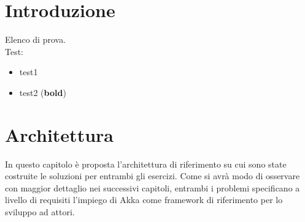 \documentclass[12pt,a4paper,openright,oneside]{report}
\begin{document}
	\begin{titlepage}                       %
		\newpage                                %
		\clearpage{\pagestyle{empty}\cleardoublepage}%
	\end{titlepage}
	\tableofcontents                        %
	\clearpage{\pagestyle{empty}\cleardoublepage}
	\listoffigures                          %
	\clearpage{\pagestyle{empty}\cleardoublepage}
	\listoftables                           %
	\clearpage{\pagestyle{empty}\cleardoublepage}
	\lstlistoflistings						%
	\clearpage{\pagestyle{empty}\cleardoublepage}
	\chapter*{Introduzione}                 %
	Elenco di prova.\\
	Test:
	\begin{itemize}
		\item test1
		\item test2 (\textbf{bold})
	\end{itemize}
	\clearpage{\pagestyle{empty}\cleardoublepage}
	\chapter{Architettura}           %
	\lhead[\fancyplain{}{\bfseries\thepage}]{\fancyplain{}{\bfseries\rightmark}}
	In questo capitolo è proposta l'architettura di riferimento su cui sono state costruite le soluzioni
	per entrambi gli esercizi. Come si avrà modo di osservare con maggior dettaglio nei successivi capitoli,
	entrambi i problemi specificano a livello di requisiti l'impiego di Akka come framework di
	riferimento per lo sviluppo ad attori.\\
	
\end{document}
